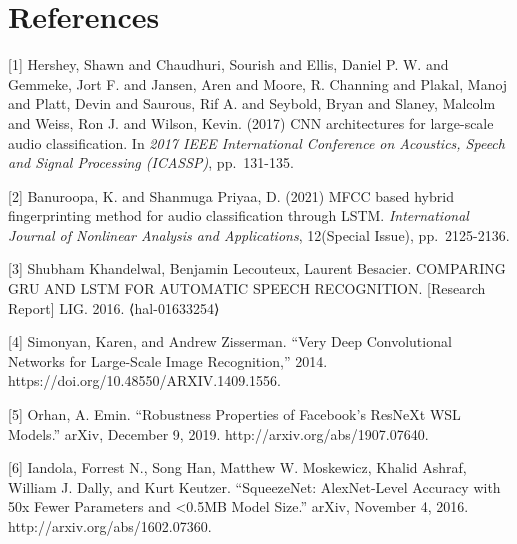 \documentclass{article}
\begin{document}
\newblock
\section*{References}
[1] Hershey, Shawn and Chaudhuri, Sourish and Ellis, Daniel P. W. and Gemmeke, Jort F. and Jansen, Aren and Moore, R. Channing and Plakal, Manoj and Platt, Devin and Saurous, Rif A. and Seybold, Bryan and Slaney, Malcolm and Weiss, Ron J. and Wilson, Kevin. (2017) CNN architectures for large-scale audio classification. In {\it 2017 IEEE International Conference on Acoustics, Speech and Signal Processing (ICASSP)}, pp.\ 131-135.

[2] Banuroopa, K. and Shanmuga Priyaa, D. (2021) MFCC based hybrid fingerprinting method for audio classification through LSTM. {\it International Journal of Nonlinear Analysis and Applications}, 12(Special Issue), pp.\ 2125-2136.

[3] Shubham Khandelwal, Benjamin Lecouteux, Laurent Besacier. COMPARING GRU AND LSTM FOR AUTOMATIC SPEECH RECOGNITION. [Research Report] LIG. 2016. ⟨hal-01633254⟩

[4] Simonyan, Karen, and Andrew Zisserman. “Very Deep Convolutional Networks for Large-Scale Image Recognition,” 2014. https://doi.org/10.48550/ARXIV.1409.1556.

[5] Orhan, A. Emin. “Robustness Properties of Facebook's ResNeXt WSL Models.” arXiv, December 9, 2019. http://arxiv.org/abs/1907.07640.

[6] Iandola, Forrest N., Song Han, Matthew W. Moskewicz, Khalid Ashraf, William J. Dally, and Kurt Keutzer. “SqueezeNet: AlexNet-Level Accuracy with 50x Fewer Parameters and <0.5MB Model Size.” arXiv, November 4, 2016. http://arxiv.org/abs/1602.07360.
\end{document}
